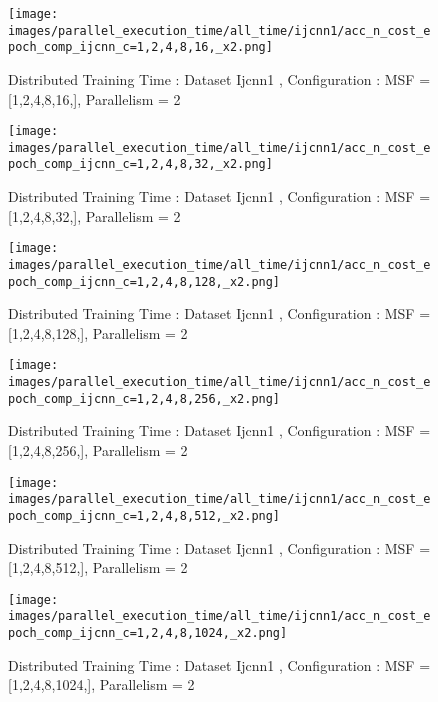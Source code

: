 \begin{figure*}[htbp]
\centering
\texttt{[image: images/parallel\_execution\_time/all\_time/ijcnn1/acc\_n\_cost\_epoch\_comp\_ijcnn\_c=1,2,4,8,16,\_x2.png]}
\caption{Distributed Training Time : Dataset Ijcnn1 , Configuration : MSF = [1,2,4,8,16,], Parallelism = 2}
\label{fig:dis-msf-tr-time-ijcnn1-x2}
\end{figure*}


\begin{figure*}[htbp]
\centering
\texttt{[image: images/parallel\_execution\_time/all\_time/ijcnn1/acc\_n\_cost\_epoch\_comp\_ijcnn\_c=1,2,4,8,32,\_x2.png]}
\caption{Distributed Training Time : Dataset Ijcnn1 , Configuration : MSF = [1,2,4,8,32,], Parallelism = 2}
\label{fig:dis-msf-tr-time-ijcnn1-x2}
\end{figure*}


\begin{figure*}[htbp]
\centering
\texttt{[image: images/parallel\_execution\_time/all\_time/ijcnn1/acc\_n\_cost\_epoch\_comp\_ijcnn\_c=1,2,4,8,128,\_x2.png]}
\caption{Distributed Training Time : Dataset Ijcnn1 , Configuration : MSF = [1,2,4,8,128,], Parallelism = 2}
\label{fig:dis-msf-tr-time-ijcnn1-x2}
\end{figure*}


\begin{figure*}[htbp]
\centering
\texttt{[image: images/parallel\_execution\_time/all\_time/ijcnn1/acc\_n\_cost\_epoch\_comp\_ijcnn\_c=1,2,4,8,256,\_x2.png]}
\caption{Distributed Training Time : Dataset Ijcnn1 , Configuration : MSF = [1,2,4,8,256,], Parallelism = 2}
\label{fig:dis-msf-tr-time-ijcnn1-x2}
\end{figure*}


\begin{figure*}[htbp]
\centering
\texttt{[image: images/parallel\_execution\_time/all\_time/ijcnn1/acc\_n\_cost\_epoch\_comp\_ijcnn\_c=1,2,4,8,512,\_x2.png]}
\caption{Distributed Training Time : Dataset Ijcnn1 , Configuration : MSF = [1,2,4,8,512,], Parallelism = 2}
\label{fig:dis-msf-tr-time-ijcnn1-x2}
\end{figure*}


\begin{figure*}[htbp]
\centering
\texttt{[image: images/parallel\_execution\_time/all\_time/ijcnn1/acc\_n\_cost\_epoch\_comp\_ijcnn\_c=1,2,4,8,1024,\_x2.png]}
\caption{Distributed Training Time : Dataset Ijcnn1 , Configuration : MSF = [1,2,4,8,1024,], Parallelism = 2}
\label{fig:dis-msf-tr-time-ijcnn1-x2}
\end{figure*}



